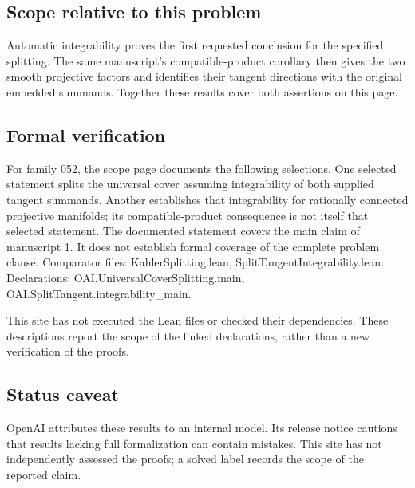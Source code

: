 \documentclass[11pt]{article}
\begin{document}
\subsection{Scope relative to this problem}
Automatic integrability proves the first requested conclusion for the specified splitting. The same manuscript's compatible-product corollary then gives the two smooth projective factors and identifies their tangent directions with the original embedded summands. Together these results cover both assertions on this page.

\subsection{Formal verification}
For family 052, the scope page documents the following selections. One selected statement splits the universal cover assuming integrability of both supplied tangent summands. Another establishes that integrability for rationally connected projective manifolds; its compatible-product consequence is not itself that selected statement. The documented statement covers the main claim of manuscript 1. It does not establish formal coverage of the complete problem clause. Comparator files: KahlerSplitting.lean, SplitTangentIntegrability.lean. Declarations: OAI.UniversalCoverSplitting.main, OAI.SplitTangent.integrability\_main.

This site has not executed the Lean files or checked their dependencies. These descriptions report the scope of the linked declarations, rather than a new verification of the proofs.

\subsection{Status caveat}
OpenAI attributes these results to an internal model. Its release notice cautions that results lacking full formalization can contain mistakes. This site has not independently assessed the proofs; a solved label records the scope of the reported claim.
\end{document}
